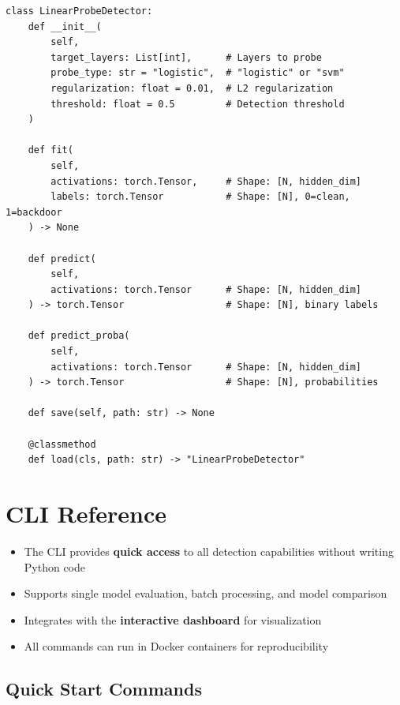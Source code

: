 \documentclass[11pt,letterpaper]{article}
\let\origsubsection\subsection
\renewcommand{\subsection}{\needspace{8\baselineskip}\origsubsection}}
\begin{document}
\begin{lstlisting}[basicstyle=\ttfamily\scriptsize]
class LinearProbeDetector:
    def __init__(
        self,
        target_layers: List[int],      # Layers to probe
        probe_type: str = "logistic",  # "logistic" or "svm"
        regularization: float = 0.01,  # L2 regularization
        threshold: float = 0.5         # Detection threshold
    )

    def fit(
        self,
        activations: torch.Tensor,     # Shape: [N, hidden_dim]
        labels: torch.Tensor           # Shape: [N], 0=clean, 1=backdoor
    ) -> None

    def predict(
        self,
        activations: torch.Tensor      # Shape: [N, hidden_dim]
    ) -> torch.Tensor                  # Shape: [N], binary labels

    def predict_proba(
        self,
        activations: torch.Tensor      # Shape: [N, hidden_dim]
    ) -> torch.Tensor                  # Shape: [N], probabilities

    def save(self, path: str) -> None

    @classmethod
    def load(cls, path: str) -> "LinearProbeDetector"
\end{lstlisting}

\section{CLI Reference}
\label{sec:cli}

\begin{tldrbox}
\begin{itemize}[nosep]
  \item The CLI provides \textbf{quick access} to all detection capabilities without writing Python code
  \item Supports single model evaluation, batch processing, and model comparison
  \item Integrates with the \textbf{interactive dashboard} for visualization
  \item All commands can run in Docker containers for reproducibility
\end{itemize}
\end{tldrbox}

\subsection{Quick Start Commands}
\end{document}
